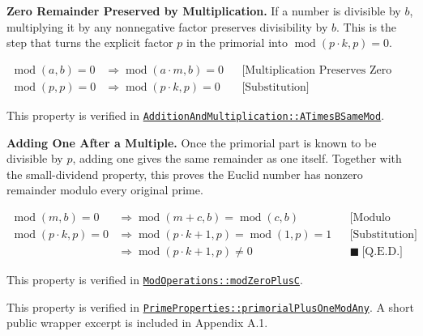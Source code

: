 \textbf{Zero Remainder Preserved by Multiplication.} If a number is
divisible by $b$, multiplying it by any nonnegative factor preserves
divisibility by $b$. This is the step that turns the explicit factor $p$
in the primorial into $\operatorname{mod}(p\cdot k,p)=0$.

\begin{equation*}
\begin{aligned}
\operatorname{mod}(a,b)=0
&\Rightarrow \operatorname{mod}(a\cdot m,b)=0
&&\text{[Multiplication Preserves Zero Remainder]} \\
\operatorname{mod}(p,p)=0
&\Rightarrow \operatorname{mod}(p\cdot k,p)=0
&&\text{[Substitution]}
\end{aligned}
\end{equation*}

This property is verified in
\href{https://github.com/thiagomata/prime-numbers/blob/euclid-theorem-article-v1.0.0/src/main/scala/v1/chapter2/div/properties/AdditionAndMultiplication.scala}{\texttt{AdditionAndMultiplication::ATimesBSameMod}}.

\textbf{Adding One After a Multiple.} Once the primorial part is known to
be divisible by $p$, adding one gives the same remainder as one itself.
Together with the small-dividend property, this proves the Euclid number
has nonzero remainder modulo every original prime.

\begin{equation*}
\begin{aligned}
\operatorname{mod}(m,b)=0
&\Rightarrow \operatorname{mod}(m+c,b)=\operatorname{mod}(c,b)
&&\text{[Modulo Shift]} \\
\operatorname{mod}(p\cdot k,p)=0
&\Rightarrow \operatorname{mod}(p\cdot k+1,p)=\operatorname{mod}(1,p)=1
&&\text{[Substitution]} \\
&\Rightarrow \operatorname{mod}(p\cdot k+1,p)\ne0
&&\blacksquare\ \text{[Q.E.D.]}
\end{aligned}
\end{equation*}

This property is verified in
\href{https://github.com/thiagomata/prime-numbers/blob/euclid-theorem-article-v1.0.0/src/main/scala/v1/chapter2/div/properties/ModOperations.scala}{\texttt{ModOperations::modZeroPlusC}}.

This property is verified in
\href{https://github.com/thiagomata/prime-numbers/blob/euclid-theorem-article-v1.0.0/src/main/scala/v1/chapter5/prime/properties/PrimeProperties.scala}{\texttt{PrimeProperties::primorialPlusOneModAny}}.
A short public wrapper excerpt is included in Appendix A.1.

